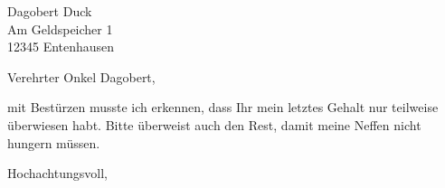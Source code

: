 \documentclass[ngerman,12pt,fromalign=center,fromrule=aftername]{scrlttr2}
\begin{document}
\begin{letter}{Dagobert Duck \\ Am Geldspeicher 1 \\ 12345 Entenhausen}

\opening{Verehrter Onkel Dagobert,}

mit Bestürzen musste ich erkennen, dass Ihr mein letztes Gehalt nur teilweise überwiesen habt. Bitte überweist auch den Rest, damit meine Neffen nicht hungern müssen.

\blindtext[5]

\closing{Hochachtungsvoll,}


\end{letter}
\end{document}
